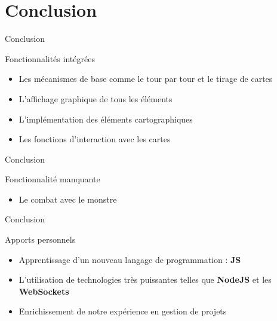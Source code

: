 \documentclass{bredelebeamer}
\begin{document}
\section{Conclusion}

\begin{frame}{Conclusion}
\begin{block}{Fonctionnalités intégrées}
    \begin{itemize}
      \item {Les mécanismes de base comme le tour par tour et le tirage de cartes}
      \pause
      \item {L’affichage graphique de tous les éléments}
      \pause
      \item {L’implémentation des éléments cartographiques}
      \pause
      \item {Les fonctions d’interaction avec les cartes}
    \end{itemize}
  \end{block}
\end{frame}

\begin{frame}{Conclusion}
\begin{block}{Fonctionnalité manquante}
    \begin{itemize}
      \pause
      \item {Le combat avec le monstre}
    \end{itemize}
  \end{block}
\end{frame}

\begin{frame}{Conclusion}
\begin{block}{Apports personnels}
\begin{itemize}
\item {Apprentissage d'un nouveau langage de programmation : \textbf{JS}}
\item {L'utilisation de technologies très puissantes telles que \textbf{NodeJS }et les \textbf{WebSockets}}
\item { Enrichissement de notre expérience en gestion de projets}
\end{itemize}
\end{block}
\end{frame}
\end{document}
